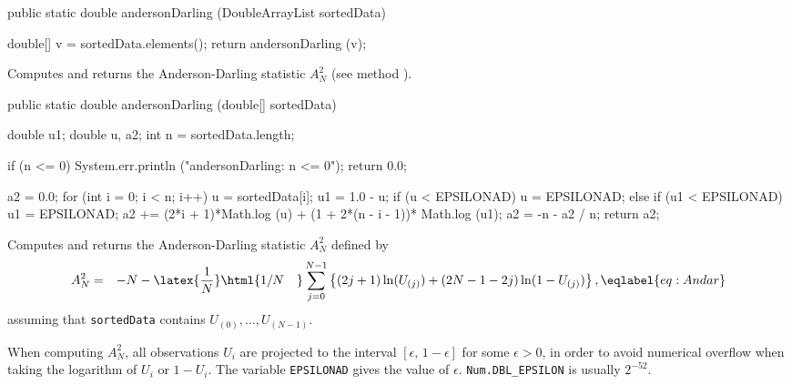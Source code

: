 \begin{code}

   public static double andersonDarling (DoubleArrayList sortedData)\begin{hide} {
      double[] v = sortedData.elements();
      return andersonDarling (v);
   }\end{hide}
\end{code}
\begin{tabb} Computes and returns the Anderson-Darling statistic $A_N^2$
(see method ).
 \end{tabb}
\begin{htmlonly}
\end{htmlonly}
\begin{code}

   public static double andersonDarling (double[] sortedData)\begin{hide} {
      double u1;
      double u, a2;
      int n = sortedData.length;

      if (n <= 0) {
         System.err.println ("andersonDarling: n <= 0");
         return 0.0;
      }

      a2 = 0.0;
      for (int i = 0; i < n; i++) {
         u = sortedData[i];
         u1 = 1.0 - u;
         if (u < EPSILONAD)
            u = EPSILONAD;
         else if (u1 < EPSILONAD)
            u1 = EPSILONAD;
         a2 += (2*i + 1)*Math.log (u) + (1 + 2*(n - i - 1))*
                    Math.log (u1);
      }
      a2 = -n - a2 / n;
      return a2;
   }\end{hide}
\end{code}
\begin{tabb} Computes and returns the Anderson-Darling statistic $A_N^2$
     defined by
  \begin {eqnarray*}
    A_N^2 &=& -N -\latex{\frac{1}{ N}}\html{1/N\quad} \sum_{j=0}^{N-1}
          \left\{ (2j+1)\ln (U_{(j)})
               + (2N-1-2j) \ln (1-U_{(j)}) \right\},      \eqlabel {eq:Andar}
  \end {eqnarray*}
  assuming that \texttt{sortedData} contains $U_{(0)},\dots,U_{(N-1)}$.
 \begin{detailed}
  When computing $A_N^2$,
  all observations $U_i$ are projected to the interval
  $[\epsilon,\,1-\epsilon]$ for some $\epsilon > 0$, in order to
  avoid numerical overflow when taking the logarithm of $U_i$ or
  $1-U_i$.  The variable \texttt{EPSILONAD} gives the value of $\epsilon$.
  \texttt{Num.DBL\_EPSILON} is usually $2^{-52}$.
 \end{detailed}
 \end{tabb}

